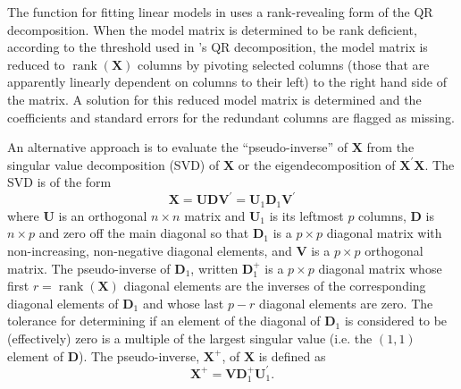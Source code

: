 \documentclass[shortnames,article]{jss}
\newcommand{\rank}{\operatorname{rank}}
\begin{document}
The  function for fitting linear models in  uses
a rank-revealing form of the QR decomposition.  When the model matrix
is determined to be rank deficient, according to the threshold used in
's QR decomposition, the model matrix is reduced to
$\rank{(\bm X)}$ columns by pivoting selected columns (those that are
apparently linearly dependent on columns to their left) to the right
hand side of the matrix.  A solution for this reduced model matrix is
determined and the coefficients and standard errors for the redundant
columns are flagged as missing.

An alternative approach is to evaluate the ``pseudo-inverse'' of $\bm
X$ from the singular value decomposition (SVD) of $\bm X$ or the
eigendecomposition of $\bm X^\prime\bm X$.  The SVD is of the form
\begin{displaymath}
  \bm X=\bm U\bm D\bm V^\prime=\bm U_1\bm D_1\bm V^\prime
\end{displaymath}
where $\bm U$ is an orthogonal $n\times n$ matrix and $\bm U_1$ is its
leftmost $p$ columns, $\bm D$ is $n\times p$ and zero off the main
diagonal so that $\bm D_1$ is a $p\times p$ diagonal matrix with
non-increasing, non-negative diagonal elements, and $\bm V$ is a $p\times
p$ orthogonal matrix.  The pseudo-inverse of $\bm D_1$, written $\bm
D_1^+$ is a $p\times p$ diagonal matrix whose first $r=\rank(\bm X)$
diagonal elements are the inverses of the corresponding diagonal
elements of $\bm D_1$ and whose last $p-r$ diagonal elements are zero.
The tolerance for determining if an element of the diagonal of $\bm D_1$
is considered to be (effectively) zero is a multiple of the largest
singular value (i.e. the $(1,1)$ element of $\bm D$).
The pseudo-inverse, $\bm X^+$, of $\bm X$ is defined as
\begin{displaymath}
  \bm X^+=\bm V\bm D_1^+\bm U_1^\prime .
\end{displaymath}
\end{document}

